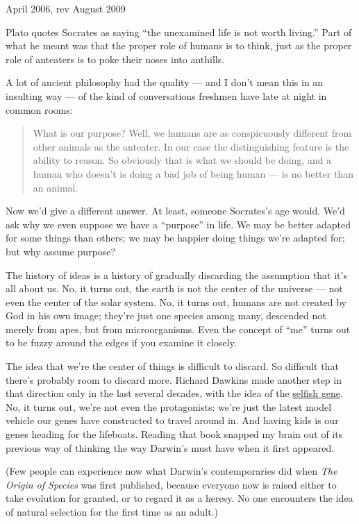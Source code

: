 April 2006, rev August 2009

Plato quotes Socrates as saying ``the unexamined life is not worth
living.'' Part of what he meant was that the proper role of humans is to
think, just as the proper role of anteaters is to poke their noses into
anthills.

A lot of ancient philosophy had the quality --- and I don't mean this in
an insulting way --- of the kind of conversations freshmen have late at
night in common rooms:

\begin{quote}
What is our purpose? Well, we humans are as conspicuously different from
other animals as the anteater. In our case the distinguishing feature is
the ability to reason. So obviously that is what we should be doing, and
a human who doesn't is doing a bad job of being human --- is no better
than an animal.
\end{quote}

Now we'd give a different answer. At least, someone Socrates's age
would. We'd ask why we even suppose we have a ``purpose'' in life. We
may be better adapted for some things than others; we may be happier
doing things we're adapted for; but why assume purpose?

The history of ideas is a history of gradually discarding the assumption
that it's all about us. No, it turns out, the earth is not the center of
the universe --- not even the center of the solar system. No, it turns
out, humans are not created by God in his own image; they're just one
species among many, descended not merely from apes, but from
microorganisms. Even the concept of ``me'' turns out to be fuzzy around
the edges if you examine it closely.

The idea that we're the center of things is difficult to discard. So
difficult that there's probably room to discard more. Richard Dawkins
made another step in that direction only in the last several decades,
with the idea of the
\href{http://en.wikipedia.org/wiki/The_Selfish_Gene}{selfish gene}. No,
it turns out, we're not even the protagonists: we're just the latest
model vehicle our genes have constructed to travel around in. And having
kids is our genes heading for the lifeboats. Reading that book snapped
my brain out of its previous way of thinking the way Darwin's must have
when it first appeared.

(Few people can experience now what Darwin's contemporaries did when
\emph{The Origin of Species} was first published, because everyone now
is raised either to take evolution for granted, or to regard it as a
heresy. No one encounters the idea of natural selection for the first
time as an adult.)

